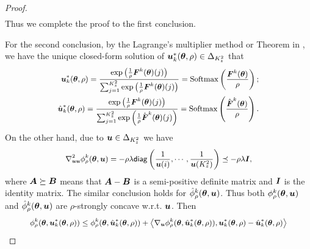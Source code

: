 \begin{proof}
\begin{equation}
\begin{aligned}
		\end{aligned}
	\end{equation}
	Thus we complete the proof to the first conclusion. 
	\par
	For the second conclusion, by the Lagrange's multiplier method or Theorem in \citep{yi2021reweighting}, we have the unique closed-form solution of $\boldsymbol{u}^{*}_{k}(\text{\boldmath{$\theta$}}, \rho)\in\Delta_{K_{z}^{2}}$ that 
	\begin{equation}
		\small
		\begin{aligned}
			\bu^{*}_{k}(\btheta, \rho) = \frac{\exp\left(\frac{1}{\rho}\bF^{k}(\btheta)(j)\right)}{\sum_{j=1}^{K_{z}^{2}}\exp\left(\frac{1}{\rho}\bF^{k}(\btheta)(j)\right)} = \mathrm{Softmax}\left(\frac{\bF^{k}(\btheta)}{\rho}\right); \\
			\hat{\bu}^{*}_{k}(\btheta, \rho) = \frac{\exp\left(\frac{1}{\rho}\bF^{k}(\btheta)(j)\right)}{\sum_{j=1}^{K_{z}^{2}}\exp\left(\frac{1}{\rho}\hat{\bF}^{k}(\btheta)(j)\right)} = \mathrm{Softmax}\left(\frac{\hat{\bF}^{k}(\btheta)}{\rho}\right).
		\end{aligned}
	\end{equation}
	On the other hand, due to $\boldsymbol{u}\in\Delta_{K_{z}^{2}}$ we have 
	\begin{equation}
		\small
		\nabla_{\bu\bu}^{2}\phi^{k}_{\rho}(\btheta, \bu) = -\rho\lambda\diag\left(\frac{1}{\bu(i)},\cdots, \frac{1}{\bu(K_{z}^{2})}\right) \preceq -\rho\lambda\bI,  
	\end{equation}
	where $\boldsymbol{A}\succeq \text{\boldmath{$B$}}$ means that $\boldsymbol{A} - \text{\boldmath{$B$}}$ is a semi-positive definite matrix and $\boldsymbol{I}$ is the identity matrix. The similar conclusion holds for $\hat{\phi}^{k}_{\rho}(\text{\boldmath{$\theta$}}, \boldsymbol{u})$. Thus both $\phi^{k}_{\rho}(\text{\boldmath{$\theta$}}, \boldsymbol{u})$ and $\hat{\phi}^{k}_{\rho}(\text{\boldmath{$\theta$}}, \boldsymbol{u})$ are $\rho$-strongly concave w.r.t. $\boldsymbol{u}$. Then 
	\begin{equation}
		\small
		\begin{aligned}
			\phi^{k}_{\rho}(\btheta, \bu^{*}_{k}(\btheta, \rho)) & \leq \phi^{k}_{\rho}(\btheta, \hat{\bu}^{*}_{k}(\btheta, \rho)) + \left\langle\nabla_{\bu}\phi^{k}_{\rho}(\btheta, \hat{\bu}^{*}_{k}(\btheta, \rho)), \bu^{*}_{k}(\btheta, \rho) - \hat{\bu}^{*}_{k}(\btheta, \rho)\right\rangle \\

\end{aligned}
\end{equation}
\end{proof}

